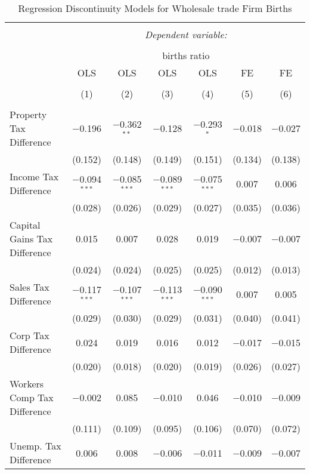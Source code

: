 
\begin{table}[!htbp] \centering 
  \caption{Regression Discontinuity Models for  Wholesale trade Firm Births} 
  \label{42rd} 
\footnotesize 
\begin{tabular}{@{\extracolsep{5pt}}lcccccc} 
\\[-1.8ex]\hline 
\hline \\[-1.8ex] 
 & \multicolumn{6}{c}{\textit{Dependent variable:}} \\ 
\cline{2-7} 
\\[-1.8ex] & \multicolumn{6}{c}{births ratio} \\ 
 & OLS & OLS & OLS & OLS & FE & FE \\ 
\\[-1.8ex] & (1) & (2) & (3) & (4) & (5) & (6)\\ 
\hline \\[-1.8ex] 
 Property Tax Difference & $-$0.196 & $-$0.362$^{**}$ & $-$0.128 & $-$0.293$^{*}$ & $-$0.018 & $-$0.027 \\ 
  & (0.152) & (0.148) & (0.149) & (0.151) & (0.134) & (0.138) \\ 
  Income Tax Difference & $-$0.094$^{***}$ & $-$0.085$^{***}$ & $-$0.089$^{***}$ & $-$0.075$^{***}$ & 0.007 & 0.006 \\ 
  & (0.028) & (0.026) & (0.029) & (0.027) & (0.035) & (0.036) \\ 
  Capital Gains Tax Difference & 0.015 & 0.007 & 0.028 & 0.019 & $-$0.007 & $-$0.007 \\ 
  & (0.024) & (0.024) & (0.025) & (0.025) & (0.012) & (0.013) \\ 
  Sales Tax Difference & $-$0.117$^{***}$ & $-$0.107$^{***}$ & $-$0.113$^{***}$ & $-$0.090$^{***}$ & 0.007 & 0.005 \\ 
  & (0.029) & (0.030) & (0.029) & (0.031) & (0.040) & (0.041) \\ 
  Corp Tax Difference & 0.024 & 0.019 & 0.016 & 0.012 & $-$0.017 & $-$0.015 \\ 
  & (0.020) & (0.018) & (0.020) & (0.019) & (0.026) & (0.027) \\ 
  Workers Comp Tax Difference & $-$0.002 & 0.085 & $-$0.010 & 0.046 & $-$0.010 & $-$0.009 \\ 
  & (0.111) & (0.109) & (0.095) & (0.106) & (0.070) & (0.072) \\ 
  Unemp. Tax Difference & 0.006 & 0.008 & $-$0.006 & $-$0.011 & $-$0.009 & $-$0.007 \\ 

\end{tabular}
\end{table}
